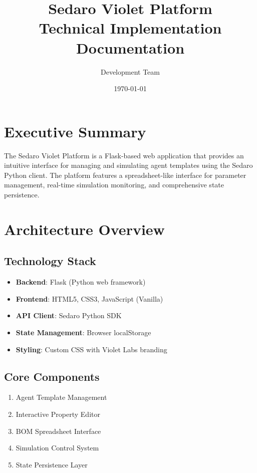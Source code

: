\documentclass[12pt,a4paper]{article}
\begin{document}
\title{\Huge\textbf{Sedaro Violet Platform}\\\large Technical Implementation Documentation}
\author{Development Team}
\date{\today}
\maketitle

\tableofcontents
\newpage

\section{Executive Summary}

The Sedaro Violet Platform is a Flask-based web application that provides an intuitive interface for managing and simulating agent templates using the Sedaro Python client. The platform features a spreadsheet-like interface for parameter management, real-time simulation monitoring, and comprehensive state persistence.

\section{Architecture Overview}

\subsection{Technology Stack}
\begin{itemize}
    \item \textbf{Backend}: Flask (Python web framework)
    \item \textbf{Frontend}: HTML5, CSS3, JavaScript (Vanilla)
    \item \textbf{API Client}: Sedaro Python SDK
    \item \textbf{State Management}: Browser localStorage
    \item \textbf{Styling}: Custom CSS with Violet Labs branding
\end{itemize}

\subsection{Core Components}
\begin{enumerate}
    \item Agent Template Management
    \item Interactive Property Editor
    \item BOM Spreadsheet Interface
    \item Simulation Control System
    \item State Persistence Layer
\end{enumerate}
\end{document}

